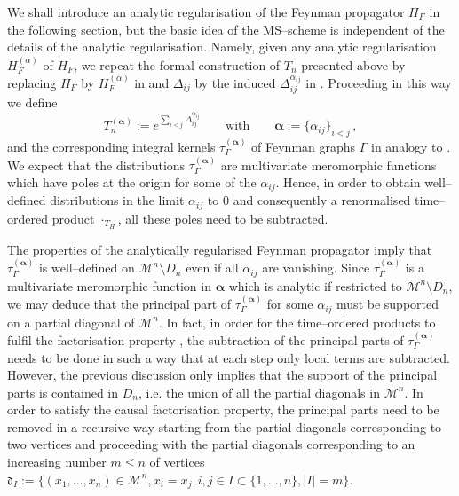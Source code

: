 \documentclass[10pt]{book}
\newcommand{\Mcal}{\mathcal{M}}
\theoremstyle{break}
\begin{document}
We shall introduce an analytic regularisation of the Feynman propagator $H_F$ in the following section, but the basic idea of the MS--scheme is independent of the details of the analytic regularisation. Namely, given 
any analytic regularisation $H^{(\alpha)}_F$ of $H_F$, we repeat the formal construction of $T_n$ presented above by replacing $H_F$ by $H^{(\alpha)}_F$ in %
and $\Delta_{ij}$ by the induced $\Delta^{\alpha_{ij}}_{ij}$ in %
. Proceeding in this way we define 
\[
T^{(\boldsymbol{\alpha})}_n := e^{\sum_{i<j}\Delta^{\alpha_{ij}}_{ij}} \qquad \text{with}\qquad \boldsymbol{\alpha} := \{\alpha_{ij}\}_{i<j}\,,
\]
and the corresponding integral kernels $\tau^{(\boldsymbol{\alpha})}_\Gamma$ of Feynman graphs $\Gamma$ in analogy to %
. We expect that the distributions $\tau^{(\boldsymbol{\alpha})}_\Gamma$ are multivariate meromorphic functions which have poles at the origin for some of the $\alpha_{ij}$. 
Hence, in order to obtain well--defined distributions in the limit $\alpha_{ij}$ to $0$ and consequently a renormalised time--ordered product $\cdot_{T_H}$, all these poles need to be subtracted.

The properties of the analytically regularised Feynman propagator imply that $\tau^{(\boldsymbol{\alpha})}_\Gamma$ is well--defined on $ \Mcal^n \setminus D_n $ %
even if all $\alpha_{ij}$ are vanishing. Since $\tau^{(\boldsymbol{\alpha})}_\Gamma$ is a multivariate meromorphic function in $\boldsymbol{\alpha}$  which is analytic if restricted to $\Mcal^n\setminus D_n$, we may deduce that the principal part of $\tau^{(\boldsymbol{\alpha})}_\Gamma$ for some $\alpha_{ij}$ must be supported on a partial diagonal of $\Mcal^n$. In fact, in order for the time--ordered products to fulfil the factorisation property %
, the subtraction of the principal parts of $\tau^{(\boldsymbol{\alpha})}_\Gamma$ needs to be done in such a way that at each step only local terms are subtracted. However, the previous discussion only implies that the support of the principal parts is contained in $D_n$, i.e. the union of all the partial diagonals in $\Mcal^n$. In order to satisfy the causal factorisation property, the principal parts need to be removed in 
a recursive way starting from the partial diagonals corresponding to two vertices and proceeding with the partial diagonals corresponding to an increasing number $m\le n$ of vertices $\mathfrak{d}_{I}:=\{ (x_1,\dots, x_n) \in \Mcal^n, x_i=x_j, i,j \in I\subset \{1,\dots, n\} , |I|=m\}$.
\end{document}
